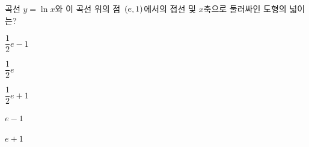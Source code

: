 \hspace*{2mm}\begin{minipage}[t]{\dimexpr\linewidth-2mm\relax}\vspace{0pt}
곡선 $y=\ln x$와 이 곡선 위의 점~$(e{,}\mkern3mu\mathopen{}1)$에서의 접선 및 $x$축으로 둘러싸인 도형의 넓이는?
\begin{choices32}{\rule[-3ex]{0pt}{8ex}$\dfrac{1}{2}e-1$}{\rule[-3ex]{0pt}{8ex}$\dfrac{1}{2}e$}{\rule[-3ex]{0pt}{8ex}$\dfrac{1}{2}e+1$}{\rule[-3ex]{0pt}{8ex}$e-1$}{\rule[-3ex]{0pt}{8ex}$e+1$}\end{choices32}\end{minipage}

